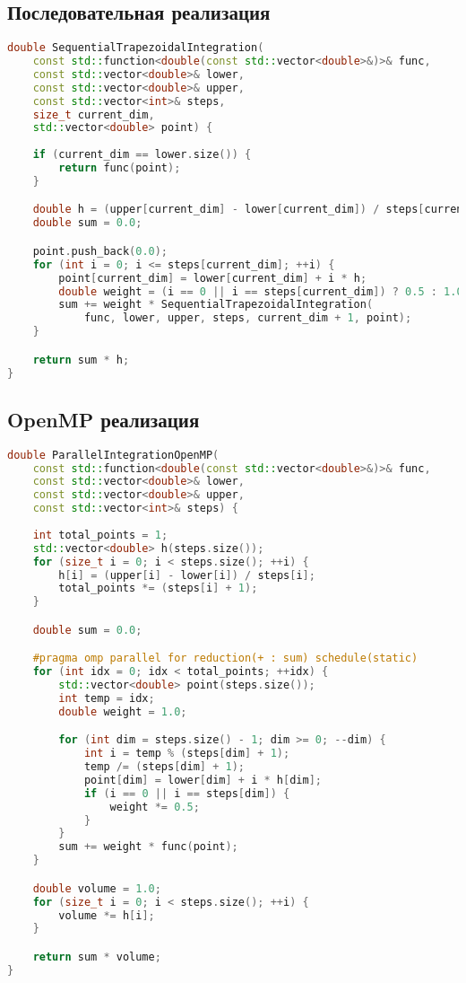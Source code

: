 \documentclass[14pt,a4paper]{extarticle}
\begin{document}
\subsection{Последовательная реализация}
\begin{lstlisting}[language=C++]
double SequentialTrapezoidalIntegration(
    const std::function<double(const std::vector<double>&)>& func,
    const std::vector<double>& lower, 
    const std::vector<double>& upper,
    const std::vector<int>& steps, 
    size_t current_dim, 
    std::vector<double> point) {
    
    if (current_dim == lower.size()) {
        return func(point);
    }

    double h = (upper[current_dim] - lower[current_dim]) / steps[current_dim];
    double sum = 0.0;

    point.push_back(0.0);
    for (int i = 0; i <= steps[current_dim]; ++i) {
        point[current_dim] = lower[current_dim] + i * h;
        double weight = (i == 0 || i == steps[current_dim]) ? 0.5 : 1.0;
        sum += weight * SequentialTrapezoidalIntegration(
            func, lower, upper, steps, current_dim + 1, point);
    }

    return sum * h;
}
\end{lstlisting}

\subsection{OpenMP реализация}
\begin{lstlisting}[language=C++]
double ParallelIntegrationOpenMP(
    const std::function<double(const std::vector<double>&)>& func,
    const std::vector<double>& lower,
    const std::vector<double>& upper,
    const std::vector<int>& steps) {
    
    int total_points = 1;
    std::vector<double> h(steps.size());
    for (size_t i = 0; i < steps.size(); ++i) {
        h[i] = (upper[i] - lower[i]) / steps[i];
        total_points *= (steps[i] + 1);
    }

    double sum = 0.0;

    #pragma omp parallel for reduction(+ : sum) schedule(static)
    for (int idx = 0; idx < total_points; ++idx) {
        std::vector<double> point(steps.size());
        int temp = idx;
        double weight = 1.0;

        for (int dim = steps.size() - 1; dim >= 0; --dim) {
            int i = temp % (steps[dim] + 1);
            temp /= (steps[dim] + 1);
            point[dim] = lower[dim] + i * h[dim];
            if (i == 0 || i == steps[dim]) {
                weight *= 0.5;
            }
        }
        sum += weight * func(point);
    }

    double volume = 1.0;
    for (size_t i = 0; i < steps.size(); ++i) {
        volume *= h[i];
    }

    return sum * volume;
}
\end{lstlisting}
\end{document}
